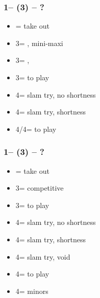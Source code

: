 \documentclass[12pt, a4paper]{article}
\begin{document}
\subsubsection*{1\spades -- (3\diams) -- ?}
\begin{itemize}
    \item \dbl = take out
    \item 3\hearts = \spades, mini-maxi
    \item 3\spades = \spades, \inv
    \item 3\nt = to play
    \item 4\clubs = slam try, no \diams shortness
    \item 4\diams = slam try, \diams shortness
    \item 4\hearts/4\spades = to play
\end{itemize}

\subsubsection*{1\spades -- (3\hearts) -- ?}
\begin{itemize}
    \item \dbl = take out
    \item 3\spades = competitive
    \item 3\nt = to play
    \item 4\clubs = slam try, no \diams shortness
    \item 4\diams = slam try, \diams shortness
    \item 4\hearts = slam try, \hearts void
    \item 4\spades = to play
    \item 4\nt = minors
\end{itemize}

\end{document}
